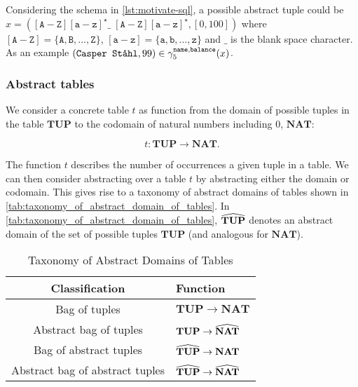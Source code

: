 Considering the schema in \autoref{lst:motivate-sql}, a possible abstract tuple could be $x = ([\texttt{A}-\texttt{Z}][\texttt{a}-\texttt{z}]^\star \_ \; [\texttt{A}-\texttt{Z}][\texttt{a}-\texttt{z}]^\star, [0, 100])$ where $[\texttt{A}-\texttt{Z}] = \{\texttt{A}, \texttt{B}, \dots, \texttt{Z}\}$, $[\texttt{a}-\texttt{z}] = \{\texttt{a}, \texttt{b}, \dots, \texttt{z}\}$ and $\_$ is the blank space character.
As an example $(\texttt{Casper Ståhl}, 99) \in \gamma_5^{\texttt{name},\texttt{balance}}(x)$.

\subsubsection{Abstract tables}\label{subsubsec:abstract_domain_of_tables}
We consider a concrete table $t$ as function from the domain of possible tuples in the table $\mathbf{TUP}$ to the codomain of natural numbers including $0$, $\mathbf{NAT}$:


\begin{equation}
    t : \mathbf{TUP} \rightarrow \mathbf{NAT}.\label{eq:equation-tup-nat}
\end{equation}


The function $t$ describes the number of occurrences a given tuple in a table.
We can then consider abstracting over a table $t$ by abstracting either the domain or codomain.
This gives rise to a taxonomy of abstract domains of tables shown in \autoref{tab:taxonomy_of_abstract_domain_of_tables}.
In \autoref{tab:taxonomy_of_abstract_domain_of_tables}, $\widehat{\mathbf{TUP}}$ denotes an abstract domain of the set of possible tuples $\mathbf{TUP}$ (and analogous for $\mathbf{NAT}$).


\begin{table}
    \renewcommand{\arraystretch}{1.3}
    \caption{Taxonomy of Abstract Domains of Tables}
    \centering
    \begin{tabular}{c|l}
        \toprule
        Classification                  & Function                                \\ \midrule
        Bag of tuples                   & $\mathbf{TUP} \rightarrow \mathbf{NAT}$           \\
        Abstract bag of tuples          & $\mathbf{TUP} \rightarrow \widehat{\mathbf{NAT}}$      \\
        Bag of abstract tuples          & $\widehat{\mathbf{TUP}} \rightarrow \mathbf{NAT}$      \\
        Abstract bag of abstract tuples & $\widehat{\mathbf{TUP}} \rightarrow \widehat{\mathbf{NAT}}$ \\ \bottomrule
    \end{tabular}
    \label{tab:taxonomy_of_abstract_domain_of_tables}
\end{table}

